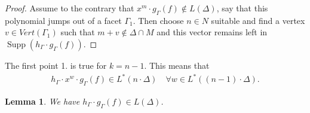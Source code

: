 \documentclass[12pt, english]{article}
\newtheorem{lemma}[definition]{Lemma}
\DeclareMathOperator{\Int}{Int}
\DeclareMathOperator{\Supp}{Supp}
\begin{document}
\begin{proof} 
	Assume to the contrary that $x^m \cdot g_{\Gamma}(f) \notin L(\Delta)$, say that this polynomial jumps out of a facet $\Gamma_1$. Then choose $n \in N$ suitable and find a vertex $v \in Vert(\Gamma_1)$ such that $m+v \notin \Delta \cap M$ and this vector remains left in $\Supp(h_{\Gamma} \cdot g_{\Gamma}(f))$.
\end{proof}




	The first point 1. is true for $k=n-1$. This means that
	\begin{align} \label{equation_condition_R_Int_f_n}
		h_{\Gamma} \cdot x^{w} \cdot g_{\Gamma}(f) \in L^*(n \cdot \Delta) \quad \forall w \in L^*((n-1) \cdot \Delta).
	\end{align}


	\begin{lemma}
		We have $h_{\Gamma} \cdot g_{\Gamma}(f) \in L(\Delta)$.
	\end{lemma}
	
\end{document}
